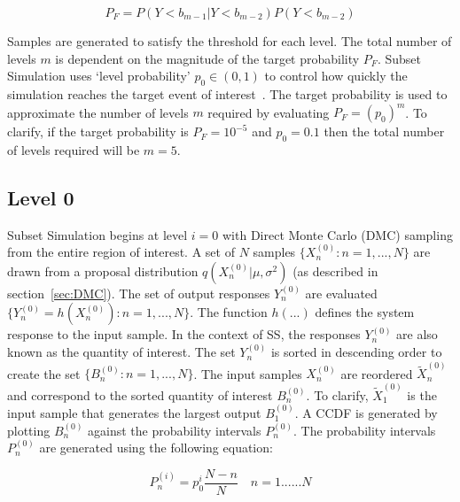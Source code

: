 \documentclass[journal]{IEEEtran}
\begin{document}
\begin{equation}	 
	P_{F} = P(Y < b_{m-1} | Y < b_{m-2})P(Y < b_{m-2})
	\label{eq:cond_struct}
\end{equation}

Samples are generated to satisfy the threshold for each level. The total number of levels $m$ is dependent on the magnitude of the target probability $P_{F}$. Subset Simulation uses `level probability' $p_{0} \in (0,1)$ to control how quickly the simulation reaches the target event of interest~\cite{IVAN}. The target probability is used to approximate the number of levels $m$ required by evaluating $P_{F} = (p_{0})^{m}$. To clarify, if the target probability is $P_{F} = 10^{-5}$ and $p_{0} = 0.1$ then the total number of levels required will be $m = 5$.

\subsection{Level 0}

Subset Simulation begins at level $i = 0$ with Direct Monte Carlo (DMC) sampling from the entire region of interest. A set of $N$ samples $\{X_{n}^{(0)}: n = 1,...,N\}$ are drawn from a proposal distribution $q(X_{n}^{(0)}|\mu,\sigma^{2})$ (as described in section~\ref{sec:DMC}). The set of output responses $Y_{n}^{(0)}$ are evaluated $\{Y_{n}^{(0)} = h(X_{n}^{(0)}): n = 1,...,N\}$. The function $h(...)$ defines the system response to the input sample. In the context of SS, the responses $Y_{n}^{(0)}$ are also known as the quantity of interest. The set $Y_{n}^{(0)}$ is sorted in descending order to create the set $\{B_{n}^{(0)}: n = 1,...,N\}$. The input samples $X_{n}^{(0)}$ are reordered $\tilde{X}_{n}^{(0)}$ and correspond to the sorted quantity of interest $B_{n}^{(0)}$. To clarify, $\tilde{X}_{1}^{(0)}$ is the input sample that generates the largest output $B_{1}^{(0)}$. A CCDF is generated by plotting $B_{n}^{(0)}$ against the probability intervals $P_{n}^{(0)}$. The probability intervals $P_{n}^{(0)}$ are generated using the following equation:

\begin{equation}	
	P_{n}^{(i)} = p_{0}^i\frac{N - n}{N}	\quad n = 1......N
	\label{eq:prob_intervals}
\end{equation}
\end{document}
